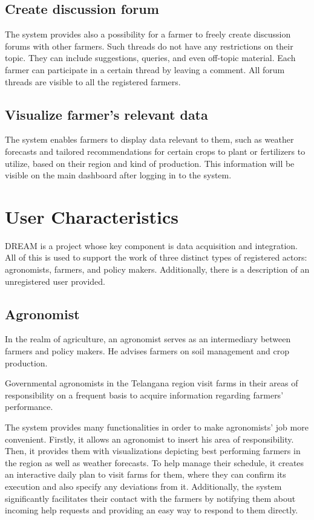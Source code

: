 \subsection{Create discussion forum}

The system provides also a possibility for a farmer to freely create discussion forums with other farmers. Such threads do not have any restrictions on their topic. They can include suggestions, queries, and even off-topic material. Each farmer can participate in a certain thread by leaving a comment. All forum threads are visible to all the registered farmers.

\subsection{Visualize farmer's relevant data}

The system enables farmers to display data relevant to them, such as weather forecasts and tailored recommendations for certain crops to plant or fertilizers to utilize, based on their region and kind of production. This information will be visible on the main dashboard after logging in to the system.

\section{User Characteristics} \label{sec:user_characteristics}

DREAM is a project whose key component is data acquisition and integration. All of this is used to support the work of three distinct types of registered actors: agronomists, farmers, and policy makers. Additionally, there is a description of an unregistered user provided.

\subsection{Agronomist} \label{subsec:agronomist}

In the realm of agriculture, an agronomist serves as an intermediary between farmers and policy makers. He advises farmers on soil management and crop production.

Governmental agronomists in the Telangana region visit farms in their areas of responsibility on a frequent basis to acquire information regarding farmers' performance.

The system provides many functionalities in order to make agronomists' job more convenient. Firstly, it allows an agronomist to insert his area of responsibility. Then, it provides them with visualizations depicting best performing farmers in the region as well as weather forecasts. To help manage their schedule, it creates an interactive daily plan to visit farms for them, where they can confirm its execution and also specify any deviations from it. Additionally, the system significantly facilitates their contact with the farmers by notifying them about incoming help requests and providing an easy way to respond to them directly.

